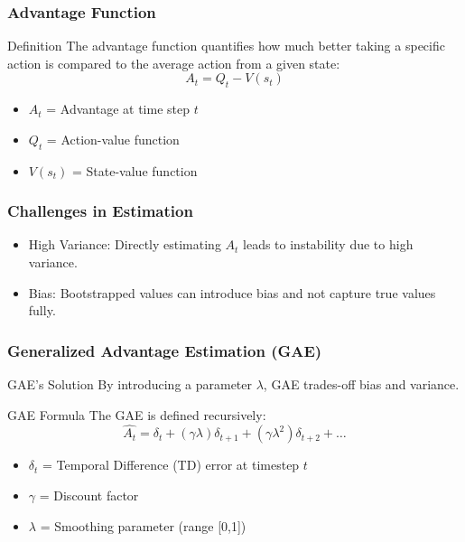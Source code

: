 \documentclass[aspectratio=169]{beamer}
\begin{document}
\begin{frame}[fragile]
    \frametitle{Advantage Function}
    \begin{block}{Definition}
        The advantage function quantifies how much better taking a specific action is compared to the average action from a given state:
        \begin{equation}
        A_t = Q_t - V(s_t)
        \end{equation}
    \end{block}
    \begin{itemize}
        \item \(A_t\) = Advantage at time step \(t\)
        \item \(Q_t\) = Action-value function
        \item \(V(s_t)\) = State-value function
    \end{itemize}
\end{frame}

\begin{frame}[fragile]
    \frametitle{Challenges in Estimation}
    \begin{itemize}
        \item High Variance: Directly estimating \(A_t\) leads to instability due to high variance.
        \item Bias: Bootstrapped values can introduce bias and not capture true values fully.
    \end{itemize}
\end{frame}

\begin{frame}[fragile]
    \frametitle{Generalized Advantage Estimation (GAE)}
    \begin{block}{GAE's Solution}
        By introducing a parameter \(\lambda\), GAE trades-off bias and variance.
    \end{block}
    \begin{block}{GAE Formula}
        The GAE is defined recursively:
        \begin{equation}
        \hat{A_t} = \delta_t + (\gamma \lambda) \delta_{t+1} + (\gamma \lambda^2) \delta_{t+2} + \dots
        \end{equation}
    \end{block}
    \begin{itemize}
        \item \(\delta_t\) = Temporal Difference (TD) error at timestep \(t\)
        \item \(\gamma\) = Discount factor
        \item \(\lambda\) = Smoothing parameter (range [0,1])
    \end{itemize}
\end{frame}
\end{document}
